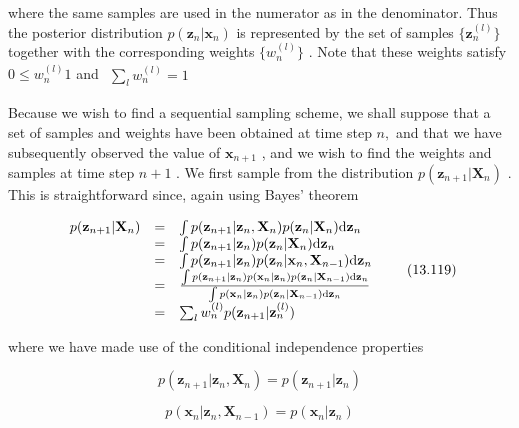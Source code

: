 \documentclass[
  10
]{article}
\begin{document}
where the same samples are used in the numerator as in the denominator.
Thus the posterior distribution
\(p ( \mathbf { z } _ { n } | \mathbf { x } _ { n } )\) is represented
by the set of samples \(\{ \mathbf { z } _ { n } ^ { ( l ) } \}\)
together with the corresponding weights \(\{ w _ { n } ^ { ( l ) } \}\)
. Note that these weights satisfy
\(0 \leqslant w _ { n } ^ { ( l ) } 1\) and
\(\begin{array} { r } { \sum _ { l } w _ { n } ^ { ( l ) } = 1 } \end{array}\)

Because we wish to find a sequential sampling scheme, we shall suppose
that a set of samples and weights have been obtained at time step
\(n ,\) and that we have subsequently observed the value of
\(\mathbf x _ { n + 1 }\) , and we wish to find the weights and samples
at time step \(n + 1\) . We first sample from the distribution
\(p ( \mathbf { z } _ { n + 1 } | \mathbf { X } _ { n } )\) . This is
straightforward since, again using Bayes' theorem

\[
\begin{array}{r c l} p (\mathbf {z} _ {n + 1} | \mathbf {X} _ {n}) & = & \int p (\mathbf {z} _ {n + 1} | \mathbf {z} _ {n}, \mathbf {X} _ {n}) p (\mathbf {z} _ {n} | \mathbf {X} _ {n})   \mathrm{d} \mathbf {z} _ {n} \\ & = & \int p (\mathbf {z} _ {n + 1} | \mathbf {z} _ {n}) p (\mathbf {z} _ {n} | \mathbf {X} _ {n})   \mathrm{d} \mathbf {z} _ {n} \\ & = & \int p (\mathbf {z} _ {n + 1} | \mathbf {z} _ {n}) p (\mathbf {z} _ {n} | \mathbf {x} _ {n}, \mathbf {X} _ {n - 1})   \mathrm{d} \mathbf {z} _ {n} \\ & = & \frac {\int p (\mathbf {z} _ {n + 1} | \mathbf {z} _ {n}) p (\mathbf {x} _ {n} | \mathbf {z} _ {n}) p (\mathbf {z} _ {n} | \mathbf {X} _ {n - 1})   \mathrm{d} \mathbf {z} _ {n}}{\int p (\mathbf {x} _ {n} | \mathbf {z} _ {n}) p (\mathbf {z} _ {n} | \mathbf {X} _ {n - 1})   \mathrm{d} \mathbf {z} _ {n}} \\ & = & \sum_ {l} w _ {n} ^ {(l)} p (\mathbf {z} _ {n + 1} | \mathbf {z} _ {n} ^ {(l)}) \end{array}\tag{13.119}
\]

where we have made use of the conditional independence properties

\[
{p (\mathbf {z} _ {n + 1} | \mathbf {z} _ {n}, \mathbf {X} _ {n})} = {p (\mathbf {z} _ {n + 1} | \mathbf {z} _ {n})}\tag{13.120}
\]

\[
{p (\mathbf {x} _ {n} | \mathbf {z} _ {n}, \mathbf {X} _ {n - 1})} = {p (\mathbf {x} _ {n} | \mathbf {z} _ {n})}\tag{13.121}
\]
\end{document}
